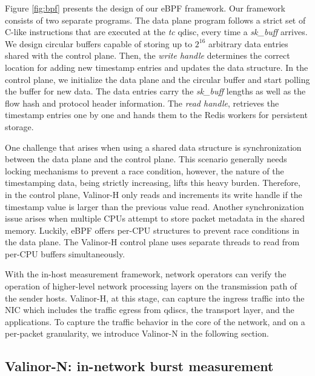 Figure \ref{fig:bpf} presents the design of our eBPF framework. Our framework consists of two separate programs. The data plane program follows a strict set of C-like instructions that are executed at the \textit{tc} qdisc, every time a \textit{sk\_buff} arrives. We design circular buffers capable of storing up to $2^{16}$ arbitrary data entries shared with the control plane. Then, the \textit{write handle} determines the correct location for adding new timestamp entries and updates the data structure. In the control plane, we initialize the data plane and the circular buffer and start polling the buffer for new data. The data entries carry the \textit{sk\_buff} lengths as well as the flow hash and protocol header information. The \textit{read handle}, retrieves the timestamp entries one by one and hands them to the Redis workers for persistent storage.

One challenge that arises when using a shared data structure is synchronization between the data plane and the control plane. This scenario generally needs locking mechanisms to prevent a race condition, however, the nature of the timestamping data, being strictly increasing, lifts this heavy burden. Therefore, in the control plane, Valinor-H only reads and increments its write handle if the timestamp value is larger than the previous value read.
Another synchronization issue arises when multiple CPUs attempt to store packet metadata in the shared memory. Luckily, eBPF offers per-CPU structures to prevent race conditions in the data plane. The Valinor-H control plane uses separate threads to read from per-CPU buffers simultaneously.

With the in-host measurement framework, network operators can verify the operation of higher-level network processing layers on the transmission path of the sender hosts. Valinor-H, at this stage, can capture the ingress traffic into the NIC which includes the traffic egress from qdiscs, the transport layer, and the applications. To capture the traffic behavior in the core of the network, and on a per-packet granularity, we introduce Valinor-N in the following section.


\subsection{Valinor-N: in-network burst measurement}
\label{sec:innetwork}


